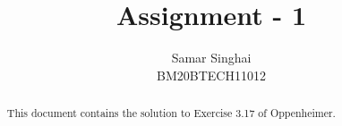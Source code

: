 \documentclass[journal,12pt,twocolumn]{IEEEtran}
\renewcommand\thesection{\arabic{section}}
\begin{document}
\def\putbox#1#2#3{\makebox[0in][l]{\makebox[#1][l]{}\raisebox{\baselineskip}[0in][0in]{\raisebox{#2}[0in][0in]{#3}}}}
     \def\rightbox#1{\makebox[0in][r]{#1}}
     \def\centbox#1{\makebox[0in]{#1}}
     \def\topbox#1{\raisebox{-\baselineskip}[0in][0in]{#1}}
     \def\midbox#1{\raisebox{-0.5\baselineskip}[0in][0in]{#1}}

\vspace{3cm}

\title{Assignment - 1}

\author{Samar Singhai\\BM20BTECH11012} 

\maketitle






\bigskip

\begin{abstract}
This document contains the solution to Exercise 3.17 of Oppenheimer.
\end{abstract}
\end{document}
